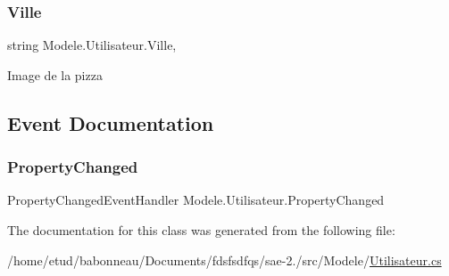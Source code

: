 \mbox{\label{classModele_1_1Utilisateur_add873e1f9c9c49bc1ab75d4850a41aa8}} 
\subsubsection{\texorpdfstring{Ville}{Ville}}
{\footnotesize\ttfamily string Modele.\+Utilisateur.\+Ville\hspace{0.3cm}{\ttfamily [get]}, {\ttfamily [set]}}



Image de la pizza 



\subsection{Event Documentation}
\mbox{\label{classModele_1_1Utilisateur_a74ad3e3725762ef45b34238f0b1cebc7}} 
\subsubsection{\texorpdfstring{Property\+Changed}{PropertyChanged}}
{\footnotesize\ttfamily Property\+Changed\+Event\+Handler Modele.\+Utilisateur.\+Property\+Changed}



The documentation for this class was generated from the following file\+:\begin{DoxyCompactItemize}
\item 
/home/etud/babonneau/\+Documents/fdsfsdfqs/sae-\/2./src/\+Modele/\hyperlink{Utilisateur_8cs}{Utilisateur.\+cs}\end{DoxyCompactItemize}
